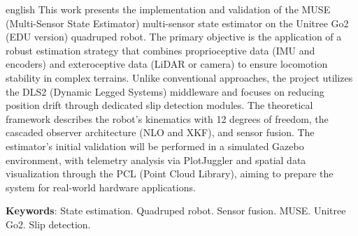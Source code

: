
\begin{resumo}[Abstract]
 \begin{otherlanguage*}{english}
This work presents the implementation and validation of the MUSE 
(Multi-Sensor State Estimator) multi-sensor state estimator on the Unitree Go2 
(EDU version) quadruped robot. The primary objective is the application of a 
robust estimation strategy that combines proprioceptive data (IMU and encoders) 
and exteroceptive data (LiDAR or camera) to ensure locomotion stability in 
complex terrains. Unlike conventional approaches, the project utilizes the DLS2 
(Dynamic Legged Systems) middleware and focuses on reducing position drift 
through dedicated slip detection modules. The theoretical framework describes 
the robot's kinematics with 12 degrees of freedom, the cascaded observer 
architecture (NLO and XKF), and sensor fusion. The estimator's initial 
validation will be performed in a simulated Gazebo environment, with telemetry 
analysis via PlotJuggler and spatial data visualization through the PCL
 (Point Cloud Library), aiming to prepare the system for real-world hardware 
 applications.

   \textbf{Keywords}: State estimation. Quadruped robot. Sensor fusion. MUSE. Unitree Go2. Slip detection.
 \end{otherlanguage*}
\end{resumo}
